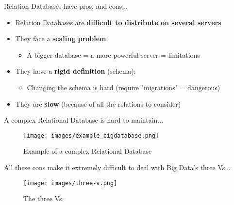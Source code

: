 \documentclass{beamer}[10pt, usepdftitle=false handout]
\begin{document}
	\begin{frame}
	
	Relation Databases have pros, and cons...	
	\vspace*{0.6em}	
	
	\begin{itemize}
	\item{Relation Databases are \textbf{difficult to distribute on several servers}}
	\item{They face a \textbf{scaling problem} 
		\begin{itemize}
			\item{A bigger database = a more powerful server = limitations}
		\end{itemize}			
	}	
	\item{They have a \textbf{rigid definition} (schema):
		\begin{itemize}
			\item{Changing the schema is hard (require "migrations" = dangerous)}
		\end{itemize}			
	}
	\item{They are \textbf{slow} (because of all the relations to consider)}
	\end{itemize}

	\end{frame}	
	
	\begin{frame}
		
	A complex Relational Database is hard to maintain...
	\vspace*{0.6em}		
		
	\begin{figure}
	\texttt{[image: images/example\_bigdatabase.png]} 
     	\vspace*{-0.5em}
		\caption{Example of a complex Relational Database}
	\end{figure}
	
	
	\end{frame}		
	
	
	\begin{frame}
	
	All these cons make it extremely difficult to deal with Big Data's three Vs...
	\vspace*{0.6em}
	
	\begin{figure}
	\texttt{[image: images/three-v.png]} 
     	\vspace*{-0.5em}
		\caption{The three Vs.}
	\end{figure}	
	
	
	\end{frame}	
	
\end{document}
